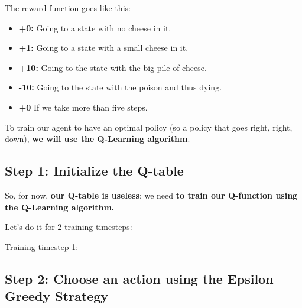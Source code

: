 \documentclass[11pt,a4paper]{article}
\begin{document}

The reward function goes like this:

\begin{itemize}
\tightlist
\item
  \textbf{+0:} Going to a state with no cheese in it.
\item
  \textbf{+1:} Going to a state with a small cheese in it.
\item
  \textbf{+10:} Going to the state with the big pile of cheese.
\item
  \textbf{-10:} Going to the state with the poison and thus dying.
\item
  \textbf{+0} If we take more than five steps.
\end{itemize}


To train our agent to have an optimal policy (so a policy that goes right, right, down), \textbf{we will use the Q-Learning algorithm}.

\subsection{Step 1: Initialize the Q-table}\label{step-1-initialize-the-q-table}


So, for now, \textbf{our Q-table is useless}; we need \textbf{to train our Q-function using the Q-Learning algorithm.}

Let's do it for 2 training timesteps:

Training timestep 1:

\subsection{Step 2: Choose an action using the Epsilon Greedy Strategy}\label{step-2-choose-an-action-using-the-epsilon-greedy-strategy-1}
\end{document}
